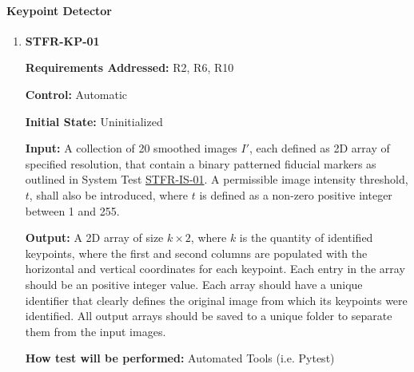 \documentclass[12pt, titlepage]{article}
\begin{document}
\paragraph{Keypoint Detector}
\begin{enumerate}
\item \hypertarget{STFR-KP-01}{\textbf{STFR-KP-01}\\}
\textbf{Requirements Addressed:} R2, R6, R10

\textbf{Control:} Automatic	

\textbf{Initial State:} Uninitialized			

\textbf{Input:} A collection of 20 smoothed images $I'$, each defined as 2D array of specified resolution, that 
contain a binary patterned fiducial markers as outlined in System Test \hyperlink{STFR-IS-01}{STFR-IS-01}. 
A permissible image intensity threshold, $t$, shall also be introduced, where $t$ is defined as a non-zero 
positive integer between 1 and 255.

\textbf{Output:} A 2D array of size ${k \times 2}$, where $k$ is the quantity of identified keypoints, 
where the first and second columns are populated with the horizontal and vertical coordinates for each 
keypoint. Each entry in the array should be an positive integer value. Each array should have a unique identifier that 
clearly defines the original image from which its keypoints were identified. All output arrays should be saved 
to a unique folder to separate them from the input images.

\textbf{How test will be performed:} Automated Tools (i.e. Pytest)
\end{enumerate}
\end{document}

